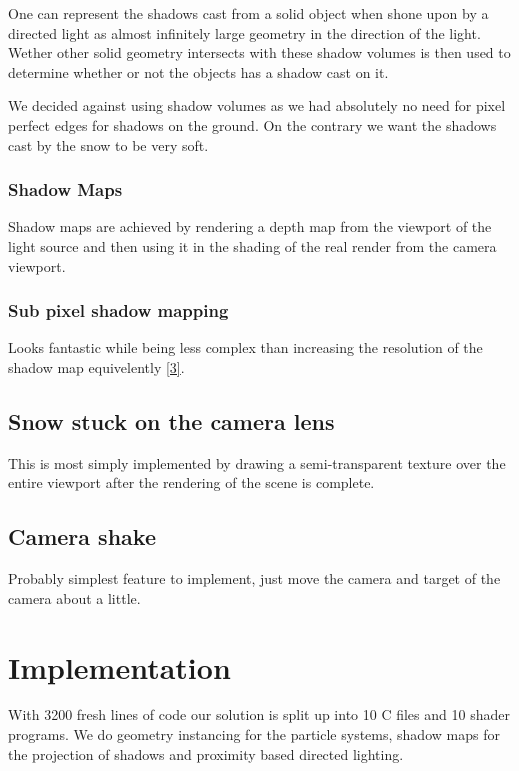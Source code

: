 \documentclass[a4paper,12pt]{article}
\begin{document}
One can represent the shadows cast from a solid object when shone upon by a directed light as almost infinitely large geometry in the direction of the light. Wether other solid geometry intersects with these shadow volumes is then used to determine whether or not the objects has a shadow cast on it.

We decided against using shadow volumes as we had absolutely no need for pixel perfect edges for shadows on the ground. On the contrary we want the shadows cast by the snow to be very soft.


\subsubsection{Shadow Maps}

Shadow maps are achieved by rendering a depth map from the viewport of the light source and then using it in the shading of the real render from the camera viewport.


\subsubsection{Sub pixel shadow mapping}
Looks fantastic while being less complex than increasing the resolution of the shadow map equivelently \href{https://www.youtube.com/watch?v=YSQDNy28SDM}{[3]}.


\subsection{Snow stuck on the camera lens}

This is most simply implemented by drawing a semi-transparent texture over the entire viewport after the rendering of the scene is complete.


\subsection{Camera shake}

Probably simplest feature to implement, just move the camera and target of the camera about a little.


\section{Implementation}

With 3200 fresh lines of code our solution is split up into 10 C files and 10 shader programs. We do geometry instancing for the particle systems, shadow maps for the projection of shadows and proximity based directed lighting.
\end{document}
